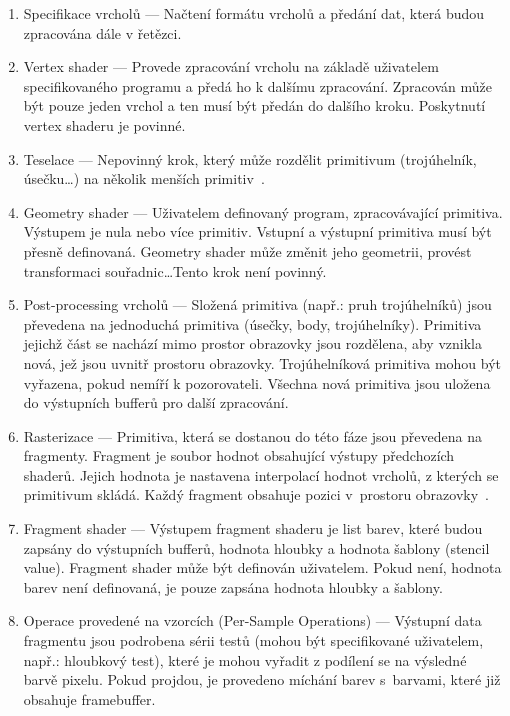 \documentclass[thesis=M,czech]{FITthesis}[2019/12/23]
\begin{document}
\begin{enumerate}
\item Specifikace vrcholů --- Načtení formátu vrcholů a předání dat, která budou zpracována dále v řetězci. 

\item Vertex shader --- Provede zpracování vrcholu na základě uživatelem specifikovaného programu a předá ho k dalšímu zpracování. Zpracován může být pouze jeden vrchol a ten musí být předán do dalšího kroku. Poskytnutí vertex shaderu je povinné.

\item Teselace --- Nepovinný krok, který může rozdělit primitivum (trojúhelník, úsečku\dots) na několik menších primitiv~\cite{kronos_tess}.

\item Geometry shader --- Uživatelem definovaný program, zpracovávající primitiva. Výstupem je nula nebo více primitiv. Vstupní a výstupní primitiva musí být přesně definovaná. Geometry shader může změnit jeho geometrii, provést transformaci souřadnic\dots Tento krok není povinný.

\item Post-processing vrcholů --- Složená primitiva (např.: pruh trojúhelníků) jsou převedena na jednoduchá primitiva (úsečky, body, trojúhelníky). Primitiva jejichž část se nachází mimo prostor obrazovky jsou rozdělena, aby vznikla nová, jež jsou uvnitř prostoru obrazovky. Trojúhelníková primitiva mohou být vyřazena, pokud nemíří k pozorovateli. Všechna nová primitiva jsou uložena do výstupních bufferů pro další zpracování.

\item Rasterizace --- Primitiva, která se dostanou do této fáze jsou převedena na fragmenty. Fragment je soubor hodnot obsahující výstupy předchozích shaderů. Jejich hodnota je nastavena interpolací hodnot vrcholů, z kterých se primitivum skládá. Každý fragment obsahuje pozici v~prostoru obrazovky~\cite{kronos_frag}.

\item Fragment shader --- Výstupem fragment shaderu je list barev, které budou zapsány do výstupních bufferů, hodnota hloubky a hodnota šablony (stencil value). Fragment shader může být definován uživatelem. Pokud není, hodnota barev není definovaná, je pouze zapsána hodnota hloubky a šablony.

\item Operace provedené na vzorcích (Per-Sample Operations) --- Výstupní data fragmentu jsou podrobena sérii testů (mohou být specifikované uživatelem, např.: hloubkový test), které je mohou vyřadit z podílení se na výsledné barvě pixelu. Pokud projdou, je provedeno míchání barev s~barvami, které již obsahuje framebuffer.
\end{enumerate}
\end{document}
